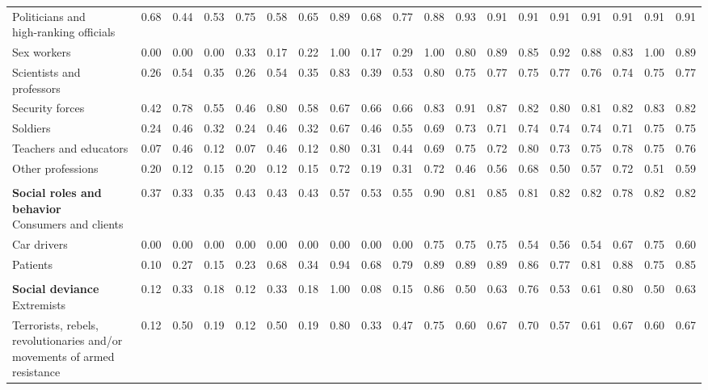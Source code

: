 \begin{table}[htb]
\begin{threeparttable}
\begin{tabular}{l ccc ccc ccc ccc ccc ccc}
\shortstack[l]{Politicians and\\[-3pt]high-ranking officials} & 0.68 & 0.44 & 0.53 & 0.75 & 0.58 & 0.65 & 0.89 & 0.68 & 0.77 & 0.88 & 0.93 & 0.91 & 0.91 & 0.91 & 0.91 & 0.91 & 0.91 & 0.91 \\
Sex workers & 0.00 & 0.00 & 0.00 & 0.33 & 0.17 & 0.22 & 1.00 & 0.17 & 0.29 & 1.00 & 0.80 & 0.89 & 0.85 & 0.92 & 0.88 & 0.83 & 1.00 & 0.89 \\
\shortstack[l]{Scientists and\\[-3pt]professors} & 0.26 & 0.54 & 0.35 & 0.26 & 0.54 & 0.35 & 0.83 & 0.39 & 0.53 & 0.80 & 0.75 & 0.77 & 0.75 & 0.77 & 0.76 & 0.74 & 0.75 & 0.77 \\
Security forces & 0.42 & 0.78 & 0.55 & 0.46 & 0.80 & 0.58 & 0.67 & 0.66 & 0.66 & 0.83 & 0.91 & 0.87 & 0.82 & 0.80 & 0.81 & 0.82 & 0.83 & 0.82 \\
Soldiers & 0.24 & 0.46 & 0.32 & 0.24 & 0.46 & 0.32 & 0.67 & 0.46 & 0.55 & 0.69 & 0.73 & 0.71 & 0.74 & 0.74 & 0.74 & 0.71 & 0.75 & 0.75 \\
Teachers and educators & 0.07 & 0.46 & 0.12 & 0.07 & 0.46 & 0.12 & 0.80 & 0.31 & 0.44 & 0.69 & 0.75 & 0.72 & 0.80 & 0.73 & 0.75 & 0.78 & 0.75 & 0.76 \\
Other professions & 0.20 & 0.12 & 0.15 & 0.20 & 0.12 & 0.15 & 0.72 & 0.19 & 0.31 & 0.72 & 0.46 & 0.56 & 0.68 & 0.50 & 0.57 & 0.72 & 0.51 & 0.59 \\
\rule{0pt}{5pt} &  &  &  &  &  &  &  &  &  &  &  &  &  &  &  &  &  &  \\
\shortstack[l]{\textbf{Social roles and behavior}\\[3pt]Consumers and clients} & 0.37 & 0.33 & 0.35 & 0.43 & 0.43 & 0.43 & 0.57 & 0.53 & 0.55 & 0.90 & 0.81 & 0.85 & 0.81 & 0.82 & 0.82 & 0.78 & 0.82 & 0.82 \\
Car drivers & 0.00 & 0.00 & 0.00 & 0.00 & 0.00 & 0.00 & 0.00 & 0.00 & 0.00 & 0.75 & 0.75 & 0.75 & 0.54 & 0.56 & 0.54 & 0.67 & 0.75 & 0.60 \\
Patients & 0.10 & 0.27 & 0.15 & 0.23 & 0.68 & 0.34 & 0.94 & 0.68 & 0.79 & 0.89 & 0.89 & 0.89 & 0.86 & 0.77 & 0.81 & 0.88 & 0.75 & 0.85 \\
\rule{0pt}{5pt} &  &  &  &  &  &  &  &  &  &  &  &  &  &  &  &  &  &  \\
\shortstack[l]{\textbf{Social deviance}\\[3pt]Extremists} & 0.12 & 0.33 & 0.18 & 0.12 & 0.33 & 0.18 & 1.00 & 0.08 & 0.15 & 0.86 & 0.50 & 0.63 & 0.76 & 0.53 & 0.61 & 0.80 & 0.50 & 0.63 \\
\shortstack[l]{Terrorists, rebels,\\[-3pt]revolutionaries and/or\\[-3pt]movements of armed resistance} & 0.12 & 0.50 & 0.19 & 0.12 & 0.50 & 0.19 & 0.80 & 0.33 & 0.47 & 0.75 & 0.60 & 0.67 & 0.70 & 0.57 & 0.61 & 0.67 & 0.60 & 0.67 \\

\end{tabular}
\end{threeparttable}
\end{table}
